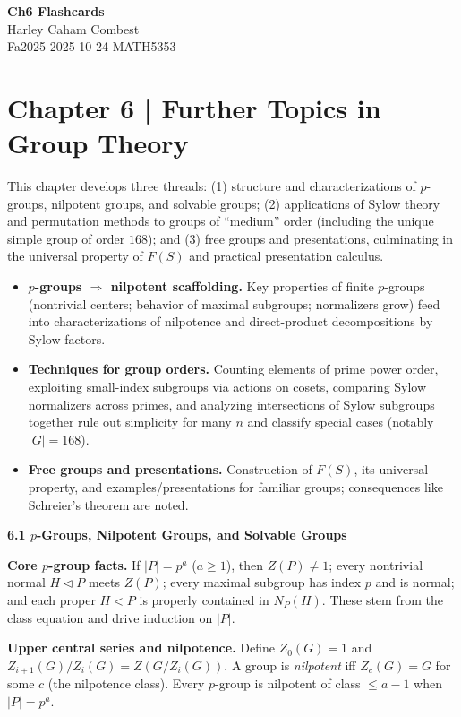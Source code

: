 \documentclass[12pt]{article}
\theoremstyle{definition}
\begin{document}
\begin{center}
\Large\textbf{Ch6 Flashcards} \\
\large Harley Caham Combest \\
\large Fa2025 2025-10-24 MATH5353
\end{center}

\newpage
\dotfill
\section*{Chapter 6 \;|\; Further Topics in Group Theory}
\dotfill

\newpage

This chapter develops three threads: (1) structure and characterizations of $p$-groups, nilpotent groups, and solvable groups; (2) applications of Sylow theory and permutation methods to groups of ``medium'' order (including the unique simple group of order $168$); and (3) free groups and presentations, culminating in the universal property of $F(S)$ and practical presentation calculus.

\begin{itemize}
\item \textbf{$p$-groups $\Rightarrow$ nilpotent scaffolding.}
Key properties of finite $p$-groups (nontrivial centers; behavior of maximal subgroups; normalizers grow) feed into characterizations of nilpotence and direct-product decompositions by Sylow factors.
\item \textbf{Techniques for group orders.}
Counting elements of prime power order, exploiting small-index subgroups via actions on cosets, comparing Sylow normalizers across primes, and analyzing intersections of Sylow subgroups together rule out simplicity for many $n$ and classify special cases (notably $|G|=168$).
\item \textbf{Free groups and presentations.}
Construction of $F(S)$, its universal property, and examples/presentations for familiar groups; consequences like Schreier’s theorem are noted.
\end{itemize}

\newpage
\textbf{6.1 \; $p$-Groups, Nilpotent Groups, and Solvable Groups}
\newpage

\textbf{Core $p$-group facts.}
If $|P|=p^a$ ($a\ge1$), then $Z(P)\neq1$; every nontrivial normal $H\lhd P$ meets $Z(P)$; every maximal subgroup has index $p$ and is normal; and each proper $H<P$ is properly contained in $N_P(H)$. These stem from the class equation and drive induction on $|P|$.

\textbf{Upper central series and nilpotence.}
Define $Z_0(G)=1$ and $Z_{i+1}(G)/Z_i(G)=Z(G/Z_i(G))$. A group is \emph{nilpotent} iff $Z_c(G)=G$ for some $c$ (the nilpotence class). Every $p$-group is nilpotent of class $\le a-1$ when $|P|=p^a$.
\end{document}
